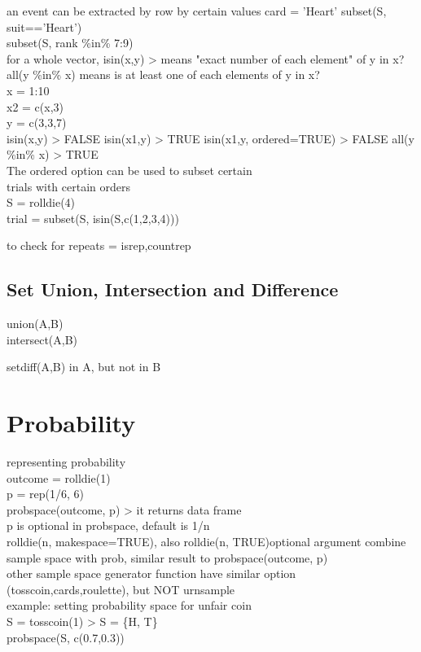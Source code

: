 \documentclass[12pt,a4paper]{report}
\begin{document}
an event can be extracted by row by certain values card = 'Heart'
subset(S, suit=='Heart')  \\
subset(S, rank \%in\% 7:9)  \\

for a whole vector, isin(x,y) > means "exact number of each element" of y in x?
all(y \%in\% x) means is at least one of each elements of y in x?  \\

x = 1:10  \\

x2 = c(x,3)  \\

y = c(3,3,7)  \\

isin(x,y) > FALSE      
isin(x1,y) > TRUE    
isin(x1,y, ordered=TRUE) > FALSE      
all(y \%in\% x) > TRUE  \\


The ordered option can be used to subset certain  \\
trials with certain orders  \\

S = rolldie(4)  \\

trial  = subset(S, isin(S,c(1,2,3,4)))          

to check for repeats = isrep,countrep\\


\subsection{Set Union, Intersection and Difference}
union(A,B)  \\

intersect(A,B)   

setdiff(A,B) in A, but not in B

\section{Probability}
representing probability  \\
outcome  = rolldie(1)  \\
p = rep(1/6, 6)  \\
probspace(outcome, p) > it returns data frame  \\
p is optional in probspace, default is 1/n  \\
rolldie(n, makespace=TRUE), also rolldie(n, TRUE)optional argument combine sample space with prob, similar result to probspace(outcome, p)  \\
other sample space generator function have similar option (tosscoin,cards,roulette), but NOT urnsample  \\
example: setting probability space for unfair coin \\
S = tosscoin(1) > S = \{H, T\} \\
probspace(S, c(0.7,0.3))
\end{document}
